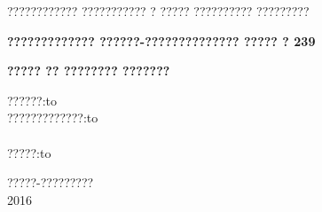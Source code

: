 	\begin{titlepage}
		\newpage
		
		\begin{center}
		\Large	???????????? ??????????? ? ????? ?????????? ????????? \\
			
		\end{center}
	\vspace{8em}
	
		\begin{center}
			\Large
		\textsc{\textbf{????????????? ??????-?????????????? ????? ? 239}}
		\end{center}
		\vspace{10em}
		
	
		
		\begin{center}
			\Large	\textsc{\textbf{	????? ?? ???????? ???????}}\\
		\end{center}
		\vspace{8em}
		
		\newbox{\lbox}
		\newlength{\maxl}
		\setlength{\maxl}{\wd\lbox}
		\hfill\parbox{11cm}{
			\hspace*{5cm}\hspace*{-5cm}??????:\hfill\hbox to\\
			\hspace*{5cm}\hspace*{-5cm}?????????????:\hfill\hbox to\\
			\\
			\hspace*{5cm}\hspace*{-5cm}?????:\hfill\hbox to\\
		}
		
		
		\vspace{\fill}
		
		\begin{center}
			?????-????????? \\2016
		\end{center}
		
	\end{titlepage}